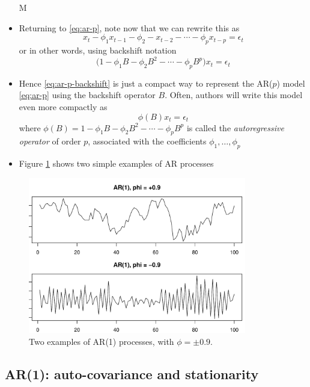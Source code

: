 \documentclass{article}
\begin{document}
\begin{itemize}
M\item Returning to \eqref{eq:ar-p}, note now that we can rewrite this as 
  \[
  x_t - \phi_1 x_{t-1} - \phi_2 - x_{t-2} - \cdots - \phi_p x_{t-p} = \epsilon_t  
  \]
  or in other words, using backshift notation 
  \begin{equation}
  \label{eq:ar-p-backshift}
  \Big(1 - \phi_1 B - \phi_2 B^2 - \cdots - \phi_p B^p \Big) x_t = \epsilon_t 
  \end{equation}

\item Hence \eqref{eq:ar-p-backshift} is just a compact way to represent the
  AR($p$) model \eqref{eq:ar-p} using the backshift operator $B$. Often, authors
  will write this model even more compactly as  
  \begin{equation}
  \label{eq:ar-p-phi}
  \phi(B) x_t = \epsilon_t 
  \end{equation}
  where $\phi(B) = 1 - \phi_1 B - \phi_2 B^2 - \cdots - \phi_p B^p$ is called
  the \emph{autoregressive operator} of order $p$, associated with the
  coefficients $\phi_1,\dots,\phi_p$

\item Figure \ref{fig:ar} shows two simple examples of AR processes
\end{itemize}

\begin{figure}[htb]
\centering
\includegraphics[width=0.85\textwidth]{fig/ar-1.pdf}
\caption{Two examples of AR(1) processes, with $\phi = \pm 0.9$.}
\label{fig:ar}
\end{figure}

\subsection{AR(1): auto-covariance and stationarity}
\end{document}
